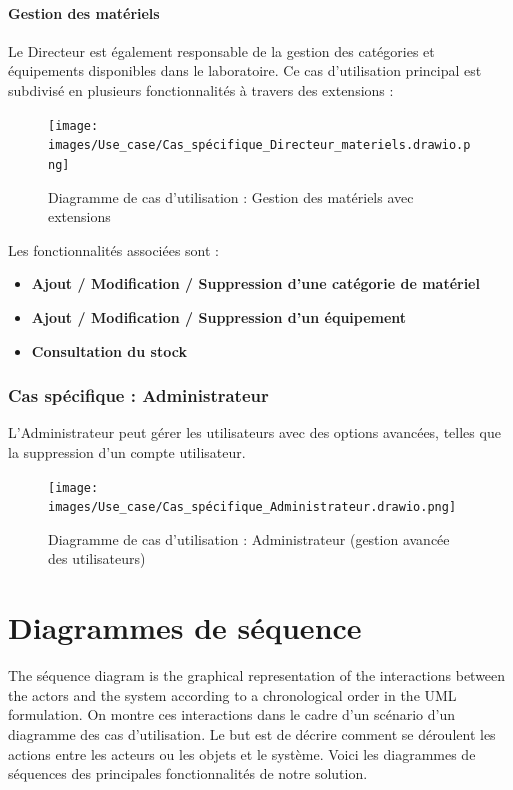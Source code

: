 \paragraph{Gestion des matériels}

Le Directeur est également responsable de la gestion des catégories et équipements disponibles dans le laboratoire. Ce cas d'utilisation principal est subdivisé en plusieurs fonctionnalités à travers des extensions :

\begin{figure}[H]
  \centering
  \texttt{[image: images/Use\_case/Cas\_spécifique\_Directeur\_materiels.drawio.png]}
  \caption{Diagramme de cas d'utilisation : Gestion des matériels avec extensions}
\end{figure}

Les fonctionnalités associées sont :
\begin{itemize}
  \item \textbf{Ajout / Modification / Suppression d'une catégorie de matériel}
  \item \textbf{Ajout / Modification / Suppression d'un équipement}
  \item \textbf{Consultation du stock}
\end{itemize}

\subsubsection{Cas spécifique : Administrateur}
L’Administrateur peut gérer les utilisateurs avec des options avancées, telles que la suppression d’un compte utilisateur.

\begin{figure}[H]
  \centering
  \texttt{[image: images/Use\_case/Cas\_spécifique\_Administrateur.drawio.png]}
  \caption{Diagramme de cas d'utilisation : Administrateur (gestion avancée des utilisateurs)}
\end{figure}

\section{Diagrammes de séquence}

The séquence diagram is the graphical representation of the interactions between the actors and the system according to a chronological order in the UML formulation. On montre ces interactions dans le cadre d'un scénario d'un diagramme des cas d'utilisation. Le but est de décrire comment se déroulent les actions entre les acteurs ou les objets et le système. Voici les diagrammes de séquences des principales fonctionnalités de notre solution.

